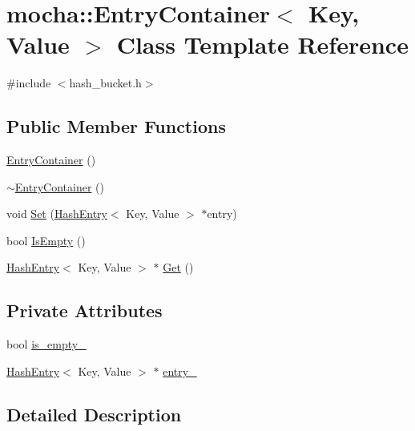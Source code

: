\hypertarget{classmocha_1_1_entry_container}{
\section{mocha::EntryContainer$<$ Key, Value $>$ Class Template Reference}
\label{classmocha_1_1_entry_container}
}


{\ttfamily \#include $<$hash\_\-bucket.h$>$}

\subsection*{Public Member Functions}
\begin{DoxyCompactItemize}
\item 
\hyperlink{classmocha_1_1_entry_container_a20eddca4ed5545f9f91f2051c15695d3}{EntryContainer} ()
\item 
\hyperlink{classmocha_1_1_entry_container_a5544d5ccafd0808904f515a959a53fba}{$\sim$EntryContainer} ()
\item 
void \hyperlink{classmocha_1_1_entry_container_a51f9734f54f8d37478d402efbe524671}{Set} (\hyperlink{classmocha_1_1_hash_entry}{HashEntry}$<$ Key, Value $>$ $\ast$entry)
\item 
bool \hyperlink{classmocha_1_1_entry_container_aaba04fde80b1c0d81c3ea0c6bd64450d}{IsEmpty} ()
\item 
\hyperlink{classmocha_1_1_hash_entry}{HashEntry}$<$ Key, Value $>$ $\ast$ \hyperlink{classmocha_1_1_entry_container_ad754db537c753c044347457a18e52413}{Get} ()
\end{DoxyCompactItemize}
\subsection*{Private Attributes}
\begin{DoxyCompactItemize}
\item 
bool \hyperlink{classmocha_1_1_entry_container_a4847640c605a8a387125bed78c608849}{is\_\-empty\_\-}
\item 
\hyperlink{classmocha_1_1_hash_entry}{HashEntry}$<$ Key, Value $>$ $\ast$ \hyperlink{classmocha_1_1_entry_container_ab8469685ebd4a1ad63d2086b50735207}{entry\_\-}
\end{DoxyCompactItemize}


\subsection{Detailed Description}
